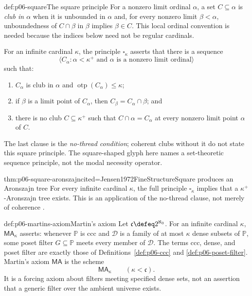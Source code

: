 \begin{hbdefinition}{def:p06-square}{The square principle}
For a nonzero limit ordinal \(\alpha\), a set \(C\subseteq\alpha\) is
\emph{club in \(\alpha\)} when it is unbounded in \(\alpha\) and, for every
nonzero limit \(\beta<\alpha\), unboundedness of \(C\cap\beta\) in \(\beta\)
implies \(\beta\in C\).  This local ordinal convention is needed because the
indices below need not be regular cardinals.

For an infinite cardinal \(\kappa\), the principle \(\square_\kappa\)
asserts that there is a sequence
\[
  \langle C_\alpha:
  \alpha<\kappa^+\text{ and }\alpha\text{ is a nonzero limit ordinal}\rangle
\]
such that:
\begin{enumerate}
  \item \(C_\alpha\) is club in \(\alpha\) and
        \(\operatorname{otp}(C_\alpha)\leq\kappa\);
  \item if \(\beta\) is a limit point of \(C_\alpha\), then
        \(C_\beta=C_\alpha\cap\beta\); and
  \item there is no club \(C\subseteq\kappa^+\) such that
        \(C\cap\alpha=C_\alpha\) at every nonzero limit point
        \(\alpha\) of \(C\).
\end{enumerate}
The last clause is the \emph{no-thread condition}; coherent clubs without it
do not state this square principle.  The square-shaped glyph here names a
set-theoretic sequence principle, not the modal necessity operator.
\end{hbdefinition}

\begin{hbtheorem}{thm:p06-square-aronszajn}{cited=Jensen1972FineStructure}{Square produces an Aronszajn tree}
For every infinite cardinal \(\kappa\), the full principle
\(\square_\kappa\) implies that a \(\kappa^+\)-Aronszajn tree exists.  This
is an application of the no-thread clause, not merely of coherence
\cite{Jensen1972FineStructure}.
\end{hbtheorem}

\begin{hbdefinition}{def:p06-martins-axiom}{Martin's axiom}
Let \(\mathfrak c\defeq2^{\aleph_0}\).  For an infinite cardinal \(\kappa\),
\(\mathsf{MA}_\kappa\) asserts: whenever \(\mathbb P\) is ccc and
\(\mathcal D\) is a family of at most \(\kappa\) dense subsets of
\(\mathbb P\), some poset filter \(G\subseteq\mathbb P\) meets every member
of \(\mathcal D\).  The terms ccc, dense, and poset filter are exactly those
of Definitions~\ref{def:p06-ccc} and \ref{def:p06-poset-filter}.
Martin's axiom \(\mathsf{MA}\) is the scheme
\[
  \mathsf{MA}_\kappa\qquad(\kappa<\mathfrak c).
\]
It is a forcing axiom about filters meeting specified dense sets, not an
assertion that a generic filter over the ambient universe exists.
\end{hbdefinition}


